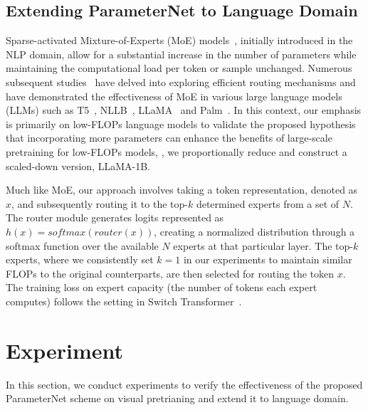\documentclass[10pt,twocolumn,letterpaper]{article}
\begin{document}
\subsection{Extending ParameterNet to Language Domain}
Sparse-activated Mixture-of-Experts (MoE) models~\cite{shazeer2017outrageously}, initially introduced in the NLP domain, allow for a substantial increase in the number of parameters while maintaining the computational load per token or sample unchanged. Numerous subsequent studies~\cite{zhou2022mixture,fedus2022switch,roller2021hash} have delved into exploring efficient routing mechanisms and have demonstrated the effectiveness of MoE in various large language models (LLMs) such as T5~\cite{t5}, NLLB~\cite{koishekenov2022memory}, LLaMA~\cite{llama} and Palm~\cite{palm}. In this context, our emphasis is primarily on low-FLOPs language models to validate the proposed hypothesis that incorporating more parameters can enhance the benefits of large-scale pretraining for low-FLOPs models, \ie, we proportionally reduce and construct a scaled-down version, LLaMA-1B.

Much like MoE, our approach involves taking a token representation, denoted as $x$, and subsequently routing it to the top-$k$ determined experts from a set of $N$. The router module generates logits represented as $h(x) = softmax(router(x))$, creating a normalized distribution through a softmax function over the available $N$ experts at that particular layer. The top-$k$ experts, where we consistently set $k=1$ in our experiments to maintain similar FLOPs to the original counterparts, are then selected for routing the token $x$. The training loss on expert capacity (the number of tokens each expert computes) follows the setting in Switch Transformer~\cite{fedus2022switch}.

\section{Experiment}
In this section, we conduct experiments to verify the effectiveness of the proposed ParameterNet scheme on visual pretrianing and extend it to language domain.
\end{document}
